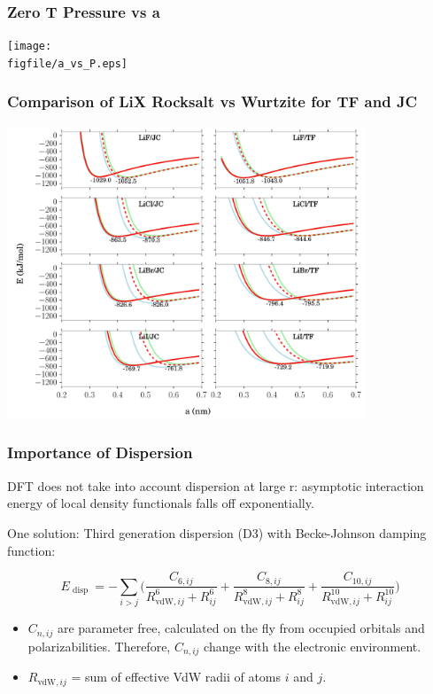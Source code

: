 \documentclass{beamer}
\newcommand{\figfile}{C:/Users/Hayden/Documents/Patey_Lab/ThesisCodeBase/Manuscript_1.0/figures}
\newenvironment{noheadline}{
	\setbeamertemplate{headline}{}
	\addtobeamertemplate{frametitle}{\vspace*{-0.9\baselineskip}}{}
}{}
\newcommand{\insertcurrentcitation}{}
\newcommand{\currentcitation}[1]{
	\renewcommand{\insertcurrentcitation}{#1}
} %
\begin{document}
\begin{noheadline}
\begin{frame}
\frametitle{Zero T Pressure vs a}
\begin{center}
	\texttt{[image: \\figfile/a\_vs\_P.eps]}
\end{center}
\end{frame}

\currentcitation{Lanaro, G. and G. N. Patey, J. Chem. Phys. \textbf{146}, 154501 (2017)}
\begin{frame}
\frametitle{Comparison of LiX Rocksalt vs Wurtzite for TF and JC}
\begin{center}
	\includegraphics[trim={0cm 0cm 0cm 0cm},clip,width=0.8\textwidth]{figures/JC_vs_TF.png}
\end{center}
\end{frame}

\currentcitation{E. Johnson and A. Becke, J. Chem. Phys. \textbf{124}, 174104 (2006)}
\begin{frame}
\frametitle{Importance of Dispersion}
DFT does not take into account dispersion at large r: asymptotic interaction energy of local density functionals falls off exponentially.
\begin{alertblock}{One solution:}
	Third generation dispersion (D3) with Becke-Johnson damping function:
\end{alertblock}
\begin{equation*}
E _ { \text { disp } } = - \sum _ { i > j } \bigg( \frac { C _ { 6 , i j } } { R _ { \text {vdW}, i j } ^ { 6 } + R _ { i j } ^ { 6 } } + \frac { C _ { 8 , i j } } { R _ { \text {vdW}, i j } ^ { 8 } + R _ { i j } ^ { 8 } } + \frac { C _ { 10 , i j } } { R _ { \text {vdW}, i j } ^ { 10 } + R _ { i j } ^ { 10 } } \bigg) 
\end{equation*}
\begin{itemize}
	\item $C_{n,ij}$ are parameter free, calculated on the fly from occupied orbitals and polarizabilities. Therefore, $C_{n,ij}$ change with the electronic environment.
	\item $R _ { \text {vdW}, i j }$ = sum of effective VdW radii of atoms $i$ and $j$.
\end{itemize}
\end{frame}


\end{noheadline}
\end{document}
